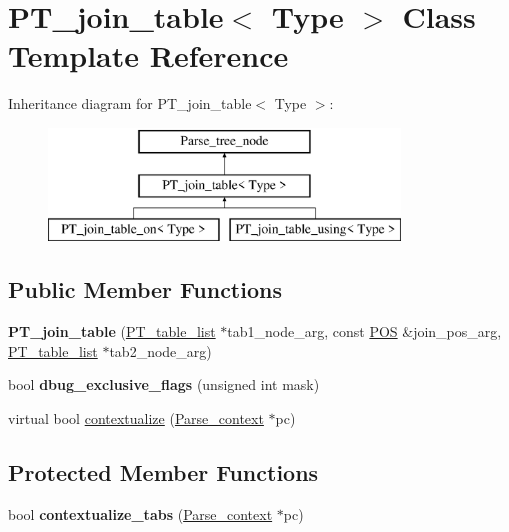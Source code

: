 \hypertarget{classPT__join__table}{}\section{P\+T\+\_\+join\+\_\+table$<$ Type $>$ Class Template Reference}
\label{classPT__join__table}
Inheritance diagram for P\+T\+\_\+join\+\_\+table$<$ Type $>$\+:\begin{figure}[H]
\begin{center}
\leavevmode
\includegraphics[height=3.000000cm]{classPT__join__table}
\end{center}
\end{figure}
\subsection*{Public Member Functions}
\begin{DoxyCompactItemize}
\item 
\mbox{\label{classPT__join__table_a8517675355ace459ccfdfa35827c9e3d}} 
{\bfseries P\+T\+\_\+join\+\_\+table} (\mbox{\hyperlink{classPT__table__list}{P\+T\+\_\+table\+\_\+list}} $\ast$tab1\+\_\+node\+\_\+arg, const \mbox{\hyperlink{structYYLTYPE}{P\+OS}} \&join\+\_\+pos\+\_\+arg, \mbox{\hyperlink{classPT__table__list}{P\+T\+\_\+table\+\_\+list}} $\ast$tab2\+\_\+node\+\_\+arg)
\item 
\mbox{\label{classPT__join__table_a61db94fe633d5cb60ecd1470103c2bd6}} 
bool {\bfseries dbug\+\_\+exclusive\+\_\+flags} (unsigned int mask)
\item 
virtual bool \mbox{\hyperlink{classPT__join__table_aa012b30af4f4d06a215c95d5417dba78}{contextualize}} (\mbox{\hyperlink{structParse__context}{Parse\+\_\+context}} $\ast$pc)
\end{DoxyCompactItemize}
\subsection*{Protected Member Functions}
\begin{DoxyCompactItemize}
\item 
\mbox{\label{classPT__join__table_a4bef35206622e1eaff26a9aa017cea00}} 
bool {\bfseries contextualize\+\_\+tabs} (\mbox{\hyperlink{structParse__context}{Parse\+\_\+context}} $\ast$pc)
\end{DoxyCompactItemize}
